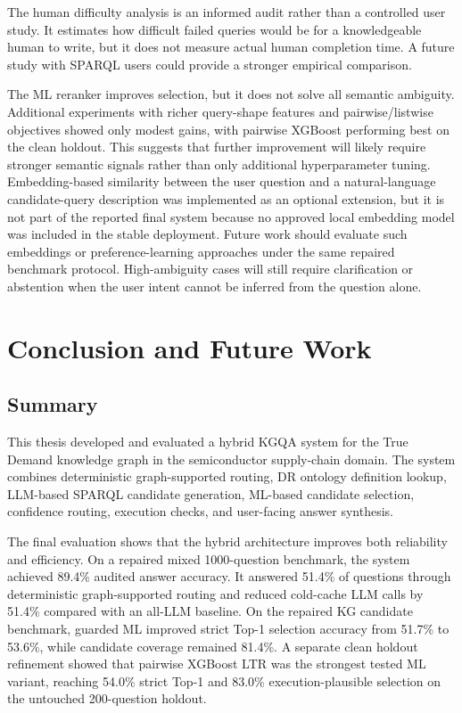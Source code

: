 \documentclass[
  12pt,
  english,
  oneside]{report}
\begin{document}
The human difficulty analysis is an informed audit rather than a controlled user study. It estimates how difficult failed queries would be for a knowledgeable human to write, but it does not measure actual human completion time. A future study with SPARQL users could provide a stronger empirical comparison.

The ML reranker improves selection, but it does not solve all semantic ambiguity. Additional experiments with richer query-shape features and pairwise/listwise objectives showed only modest gains, with pairwise XGBoost performing best on the clean holdout. This suggests that further improvement will likely require stronger semantic signals rather than only additional hyperparameter tuning. Embedding-based similarity between the user question and a natural-language candidate-query description was implemented as an optional extension, but it is not part of the reported final system because no approved local embedding model was included in the stable deployment. Future work should evaluate such embeddings or preference-learning approaches under the same repaired benchmark protocol. High-ambiguity cases will still require clarification or abstention when the user intent cannot be inferred from the question alone.


\chapter{Conclusion and Future Work}
\label{chap:conclusion}

\section{Summary}
\label{sec:conclusion-summary}

This thesis developed and evaluated a hybrid KGQA system for the True Demand knowledge graph in the semiconductor supply-chain domain. The system combines deterministic graph-supported routing, DR ontology definition lookup, LLM-based SPARQL candidate generation, ML-based candidate selection, confidence routing, execution checks, and user-facing answer synthesis.

The final evaluation shows that the hybrid architecture improves both reliability and efficiency. On a repaired mixed 1000-question benchmark, the system achieved 89.4\% audited answer accuracy. It answered 51.4\% of questions through deterministic graph-supported routing and reduced cold-cache LLM calls by 51.4\% compared with an all-LLM baseline. On the repaired KG candidate benchmark, guarded ML improved strict Top-1 selection accuracy from 51.7\% to 53.6\%, while candidate coverage remained 81.4\%. A separate clean holdout refinement showed that pairwise XGBoost LTR was the strongest tested ML variant, reaching 54.0\% strict Top-1 and 83.0\% execution-plausible selection on the untouched 200-question holdout.
\end{document}
